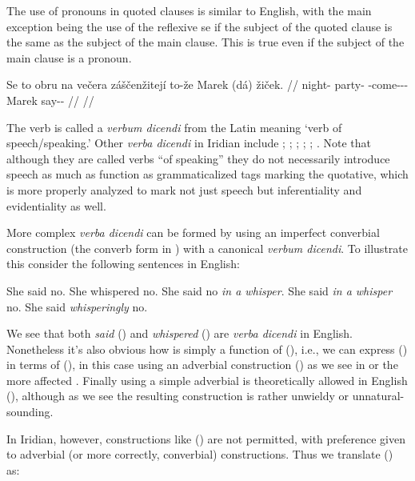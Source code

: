 The use of pronouns in quoted clauses is similar to English, with the main
exception being the use of the reflexive se if the subject of the quoted clause
is the same as the subject of the main clause. This is true even if the subject
of the main clause is a pronoun.

\pex
  \begingl
    \gla Se to obru na večera záščenžitejí to-že Marek (dá) žiček. //
    \glb \Refl{} \Dem{} night-\Ins{} \Loc{} party-\Acc{} \Neg{}-come-\Av{}-\SupP{}-\Quot{} \Qp{} Marek \First\Sg{} say-\Av{}-\Pf{} //
    \glft {}//
  \endgl
\xe

The verb  is called a \emph{verbum dicendi} from the Latin meaning ‘verb of speech/speaking.’ Other \emph{verba
dicendi} in Iridian include ; ;
; ; ;
. Note that although they are called
verbs ``of speaking'' they do not necessarily introduce speech as much as
function as grammaticalized tags marking the quotative,  which is more properly
analyzed to mark not just speech but inferentiality and evidentiality as well.

More complex \emph{verba dicendi} can be formed by using an imperfect converbial
construction (the converb form in ) with a canonical \emph{verbum
dicendi}. To illustrate this consider the following sentences in English:

\pex[*=?*,interpartskip=0pt]
\a She said no.
\a She whispered no.
\a She said no \emph{in a whisper}.
\a {} She said \emph{in a whisper} no.
\a {} She said \emph{whisperingly} no.
\xe

We see that both \emph{said} () and \emph{whispered}
() are \emph{verba dicendi} in English. Nonetheless it's also
obvious how  is simply a function of (), i.e.,
we can express () in terms of (), in this case
using an adverbial construction () as we see in
 or the more affected . Finally using a simple
adverbial is theoretically allowed in English (), although as
we see the resulting construction is rather unwieldy or unnatural-sounding.

In Iridian, however, constructions like () are not permitted,
with preference given to adverbial (or more correctly,
converbial) constructions. Thus we translate ()
as:

